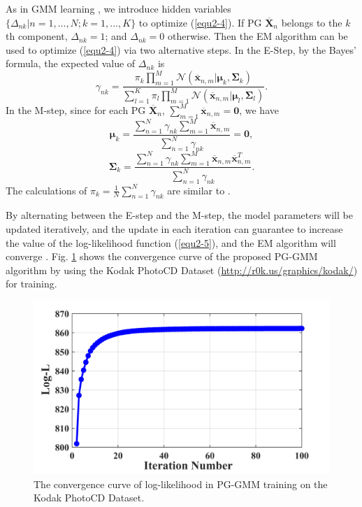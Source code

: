 As in GMM learning \cite{Bishop}, we introduce hidden variables $\{\Delta_{nk}|n=1,...,N;k=1,...,K\}$ to optimize (\ref{equ2-4}). If PG $\bm{\overline{X}}_{n}$ belongs to the $k$th component, $\Delta_{nk}=1$; and $\Delta_{nk}=0$ otherwise. Then the EM algorithm \cite{em} can be used to optimize (\ref{equ2-4}) via two alternative steps. In the E-Step, by the Bayes' formula, the expected value of $\Delta_{nk}$ is
\begin{equation}
\label{equ2-5}
\gamma_{nk}=\frac{\pi_{k}\prod_{m=1}^{M}\mathcal{N}(\bm{\overline{x}}_{n,m}|\bm{\mu}_{k},\bm{\Sigma}_{k})}{\sum_{l=1}^{K}\pi_{l}\prod_{m=1}^{M}\mathcal{N}(\bm{\overline{x}}_{n,m}|\bm{\mu}_{l},\bm{\Sigma}_{l})}.
\end{equation}
In the M-step, since for each PG $\bm{\overline{X}}_{n}$, $\sum_{m=1}^{M}\bm{\overline{x}}_{n,m}=\bm{0}$, we have
\begin{equation}
\label{equ2-6}
\bm{\mu}_{k} = \frac{\sum_{n=1}^{N}\gamma_{nk}\sum_{m=1}^{M}\bm{\overline{x}}_{n,m}}{\sum_{n=1}^{N}\gamma_{nk}}=\bm{0},
\end{equation}
\begin{equation}
\label{equ2-7}
\bm{\Sigma}_{k} = \frac{\sum_{n=1}^{N}\gamma_{nk}\sum_{m=1}^{M}\bm{\overline{x}}_{n,m}\bm{\overline{x}}_{n,m}^{T}}{\sum_{n=1}^{N}\gamma_{nk}}.
\end{equation}
The calculations of $\pi_{k}=\frac{1}{N}\sum_{n=1}^{N}\gamma_{nk}$ are similar to \cite{Bishop}.

By alternating between the E-step and the M-step, the model parameters will be updated iteratively, and the update in each iteration can guarantee to increase the value of the log-likelihood function (\ref{equ2-5}), and the EM algorithm will converge \cite{Bishop,emconvergence}. Fig. \ref{fig2-3} shows the convergence curve of the proposed PG-GMM algorithm by using the Kodak PhotoCD Dataset (\url{http://r0k.us/graphics/kodak/}) for training.
\begin{figure}[t!]
\centering
\includegraphics[width=0.75\linewidth]{images/pgpd/cvgc.png}
\vspace{-3mm}
\caption{The convergence curve of log-likelihood in PG-GMM training on the Kodak PhotoCD Dataset.
}
\label{fig2-3}
\end{figure}

